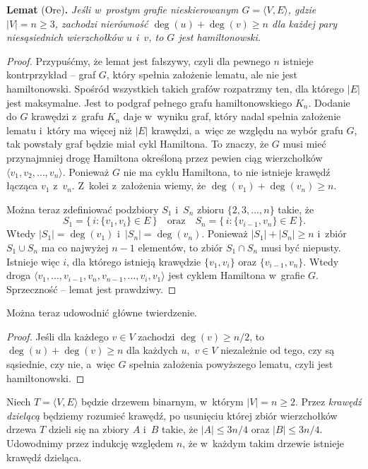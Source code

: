\medskip
\noindent\textsf{\textbf{Lemat} (Ore)\textbf{.}} \textit{Jeśli w~prostym grafie nieskierowanym\/ $G=\langle V,E\rangle$, gdzie\/ $|V|=n\ge3$, zachodzi nierówność\/ $\deg(u)+\deg(v)\ge n$ dla każdej pary niesąsiednich wierzchołków\/ $u$ i~\/$v$, to\/ $G$ jest hamiltonowski.}
\begin{proof}
Przypuśćmy, że lemat jest fałszywy, czyli dla pewnego $n$ istnieje kontrprzykład -- graf $G$, który spełnia założenie lematu, ale nie jest hamiltonowski. Spośród wszystkich takich grafów rozpatrzmy ten, dla którego $|E|$ jest maksymalne. Jest to podgraf pełnego grafu hamiltonowskiego $K_n$. Dodanie do $G$ krawędzi z~grafu $K_n$ daje w~wyniku graf, który nadal spełnia założenie lematu i~który ma więcej niż $|E|$ krawędzi, a~więc ze względu na wybór grafu $G$, tak powstały graf będzie miał cykl Hamiltona. To znaczy, że $G$ musi mieć przynajmniej drogę Hamiltona określoną przez pewien ciąg wierzchołków $\langle v_1,v_2,\dots,v_n\rangle$. Ponieważ $G$ nie ma cyklu Hamiltona, to nie istnieje krawędź łącząca $v_1$ z~$v_n$. Z~kolei z~założenia wiemy, że $\deg(v_1)+\deg(v_n)\ge n$.

Można teraz zdefiniować podzbiory $S_1$ i~$S_n$ zbioru $\{2,3,\dots,n\}$ takie, że
\[
	S_1 = \bigl\{\,i:\{v_1,v_i\}\in E\,\bigr\} \quad\text{oraz}\quad S_n = \bigl\{\,i:\{v_{i-1},v_n\}\in E\,\bigr\}.
\]
Wtedy $|S_1|=\deg(v_1)$ i~$|S_n|=\deg(v_n)$. Ponieważ $|S_1|+|S_n|\ge n$ i~zbiór $S_1\cup S_n$ ma co najwyżej $n-1$ elementów, to zbiór $S_1\cap S_n$ musi być niepusty. Istnieje więc $i$, dla którego istnieją krawędzie $\{v_1,v_i\}$ oraz $\{v_{i-1},v_n\}$. Wtedy droga $\langle v_1,\dots,v_{i-1},v_n,v_{n-1},\dots,v_i,v_1\rangle$ jest cyklem Hamiltona w~grafie $G$. Sprzeczność -- lemat jest prawdziwy.
\end{proof}

Można teraz udowodnić główne twierdzenie.
\begin{proof}
Jeśli dla każdego $v\in V$ zachodzi $\deg(v)\ge n/2$, to $\deg(u)+\deg(v)\ge n$ dla każdych $u$,~$v\in V$ niezależnie od tego, czy są sąsiednie, czy nie, a~więc $G$ spełnia założenia powyższego lematu, czyli jest hamiltonowski.
\end{proof}


\subproblem %
Niech $T=\langle V,E\rangle$ będzie drzewem binarnym, w~którym $|V|=n\ge2$. Przez \emph{krawędź dzielącą} będziemy rozumieć krawędź, po usunięciu której zbiór wierzchołków drzewa $T$ dzieli się na zbiory $A$ i~$B$ takie, że $|A|\le3n/4$ oraz $|B|\le3n/4$. Udowodnimy przez indukcję względem $n$, że w~każdym takim drzewie istnieje krawędź dzieląca.

